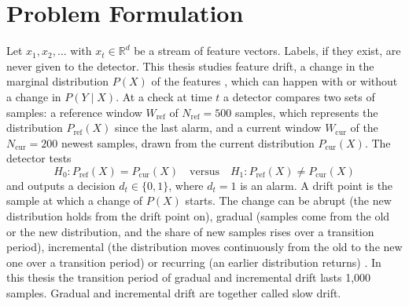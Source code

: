 \section{Problem Formulation}
\label{sec:problem}
Let $x_1, x_2, \ldots$ with $x_t \in \mathbb{R}^d$ be a stream of feature vectors. Labels, if they exist, are never given to the detector. This thesis studies feature drift, a change in the marginal distribution $P(X)$ of the features \citep{Gama2014, Webb2016}, which can happen with or without a change in $P(Y \mid X)$. At a check at time $t$ a detector compares two sets of samples: a reference window $W_{\mathrm{ref}}$ of $N_{\mathrm{ref}} = 500$ samples, which represents the distribution $P_{\mathrm{ref}}(X)$ since the last alarm, and a current window $W_{\mathrm{cur}}$ of the $N_{\mathrm{cur}} = 200$ newest samples, drawn from the current distribution $P_{\mathrm{cur}}(X)$. The detector tests
\begin{equation}
H_0: P_{\mathrm{ref}}(X) = P_{\mathrm{cur}}(X) \quad \text{versus} \quad H_1: P_{\mathrm{ref}}(X) \neq P_{\mathrm{cur}}(X)
\label{eq:drift-test}
\end{equation}
and outputs a decision $d_t \in \{0, 1\}$, where $d_t = 1$ is an alarm. A drift point is the sample at which a change of $P(X)$ starts. The change can be abrupt (the new distribution holds from the drift point on), gradual (samples come from the old or the new distribution, and the share of new samples rises over a transition period), incremental (the distribution moves continuously from the old to the new one over a transition period) or recurring (an earlier distribution returns) \citep{Gama2014}. In this thesis the transition period of gradual and incremental drift lasts 1,000 samples. Gradual and incremental drift are together called slow drift.

